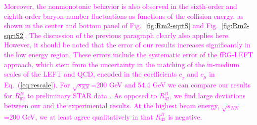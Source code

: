 \documentclass[%
reprint,
superscriptaddress,
showpacs,preprintnumbers,
 amsmath,amssymb,
 aps,
prd,
]{revtex4-1}
\def\Fig#1{Fig.~\ref{#1}} \def\Tab#1{Tab.~\ref{#1}}
\def\Eq#1{Eq.~(\ref{#1})}
\newcommand{\colfab}[1]{\textcolor{magenta}{#1}}
\begin{document}
\colfab{
Moreover, the nonmonotonic behavior is also observed in the sixth-order and eighth-order baryon number fluctuations as functions of the collision energy, as shown in the center and bottom panel of \Fig{fig:Rm2-sqrtS} and \Fig{fig:Rm2-sqrtS2}. 
\colfab{The discussion of the previous paragraph clearly also applies here.}
However, it should be noted that the error of our results increases significantly in the low energy region. These errors include the systematic error of the fRG-LEFT approach, which stem from the uncertainty in the matching of the in-medium scales of the LEFT and QCD, encoded in the coefficients $c_{_{T}}$ and $c_{\mu}$ in \Eq{eq:rescale}.%
For $\sqrt{s_{NN}}$=200 GeV and 54.4 GeV we can compare our results for $R^{B}_{62}$ to preliminary STAR data \cite{Nonaka:2020crv,Pandav:2020uzx}. As opposed to $R^{B}_{42}$, we find large deviations between our and the experimental results. At the highest beam energy, $\sqrt{s_{NN}}$=200 GeV, we at least agree qualitatively in that $R^{B}_{42}$ is negative.
}



 

\end{document}
